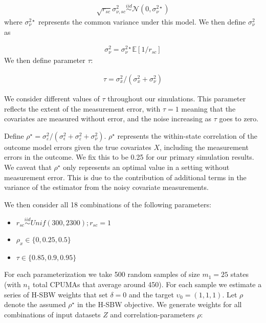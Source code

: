 \begin{align*}
    \sqrt{r_{sc}}\sigma^2_{\nu, sc} \stackrel{iid}\sim \mathcal{N}(0, \sigma^{2\star}_{\nu})
\end{align*}
%
where $\sigma_{\nu}^{2\star}$ represents the common variance under this model. We then define $\sigma_{\nu}^2$ as

\begin{align*}
    \sigma_{\nu}^2 =
     \sigma_\nu^{2\star}\mathbb{E}[1/r_{sc}]
\end{align*}
%
We then define parameter $\tau$:

\begin{align*}
    \tau = \sigma^2_x/(\sigma^2_x + \sigma^2_{\nu})
\end{align*}

We consider different values of $\tau$ throughout our simulations. This parameter reflects the extent of the measurement error, with $\tau = 1$ meaning that the covariates are measured without error, and the noise increasing as $\tau$ goes to zero.

Define $\rho^\star = \sigma^2_{\varepsilon}/(\sigma^2_{\epsilon} + \sigma^2_{\varepsilon} + \sigma^2_{\nu})$. $\rho^\star$ represents the within-state correlation of the outcome model errors given the true covariates $X$, including the measurement errors in the outcome. We fix this to be 0.25 for our primary simulation results. We caveat that $\rho^\star$ only represents an optimal value in a setting without measurement error. This is due to the contribution of additional terms in the variance of the estimator from the noisy covariate measurements.  

We then consider all 18 combinations of the following parameters:

\begin{itemize}
    \item $r_{sc} \stackrel{iid}\sim Unif(300, 2300); r_{sc} = 1$ 
    \item $\rho_x \in \{0, 0.25, 0.5\}$
    \item $\tau \in \{0.85, 0.9, 0.95\}$
\end{itemize}

For each parameterization we take 500 random samples of size $m_1 = 25$ states (with $n_1$ total CPUMAs that average around 450). For each sample we estimate a series of H-SBW weights that set $\delta = 0$ and the target $\upsilon_0 = (1, 1, 1)$. Let $\rho$ denote the assumed $\rho^\star$ in the H-SBW objective. We generate weights for all combinations of input datasets $Z$ and correlation-parameters $\rho$:

